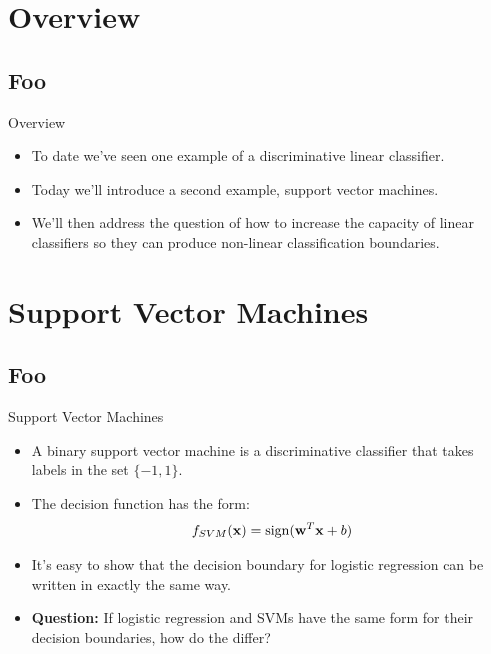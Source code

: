 \documentclass[serif,xcolor=pdftex,dvipsnames,table,hyperref={bookmarks=false}]{beamer}
\begin{document}
\maketitlepage

\section{Overview}
\subsection{Foo}

\begin{frame}[t]{Overview}

\begin{itemize}
\setlength{\itemsep}{12pt}
\item To date we've seen one example of a discriminative linear classifier.

\pause \item Today we'll introduce a second example, support vector machines.

\pause \item We'll then address the question of how to increase the capacity of 
linear classifiers so they can produce non-linear classification boundaries.

\end{itemize}

\end{frame}


\section{Support Vector Machines}
\subsection{Foo}

\begin{frame}[t]{Support Vector Machines}

\begin{itemize}
\setlength{\itemsep}{8pt}
\item A binary support vector machine is a discriminative classifier that takes labels in the set $\{-1,1\}$.

\pause\item The decision function has the form:
$$f_{SVM}({\mathbf{x}}) = \operatorname*{sign}({\mathbf{w}}^T{\mathbf{x}}+b )$$

\pause\item It's easy to show that the decision boundary for logistic regression can be written in exactly the same way.

\pause\item \textbf{Question:} If logistic regression and SVMs have the same form for their decision boundaries, how do the differ?

\end{itemize}
\end{frame}
\end{document}
